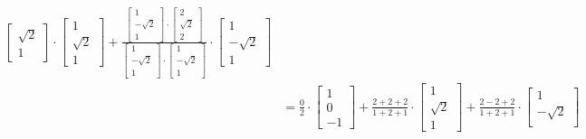 \documentclass[11pt, a4paper, norsk]{NTNUoving}
\begin{document}
\begin{oppgave}
\begin{punkt}
\begin{align*}
{\begin{bmatrix}
                \sqrt{2} \\
                1
            \end{bmatrix}} \cdot \begin{bmatrix}
                1 \\
                \sqrt{2} \\
                1
            \end{bmatrix} + \frac{\begin{bmatrix}
                1 \\
                -\sqrt{2} \\
                1
            \end{bmatrix} \cdot \begin{bmatrix}
                2 \\
                \sqrt{2} \\
                2
            \end{bmatrix}}{\begin{bmatrix}
                1 \\
                -\sqrt{2} \\
                1
            \end{bmatrix} \cdot \begin{bmatrix}
                1 \\
                -\sqrt{2} \\
                1
            \end{bmatrix}} \cdot \begin{bmatrix}
                1 \\
                -\sqrt{2} \\
                1
            \end{bmatrix}
            \\
            &= \frac{0}{2}\cdot \begin{bmatrix}
                1 \\
                0 \\
                -1
            \end{bmatrix} + \frac{2+2+2}{1+2+1} \cdot \begin{bmatrix}
                1 \\
                \sqrt{2} \\
                1
            \end{bmatrix} + \frac{2-2+2}{1+2+1} \cdot \begin{bmatrix}
                1 \\
                -\sqrt{2} \\

\end{bmatrix}
\end{align*}
\end{punkt}
\end{oppgave}
\end{document}
